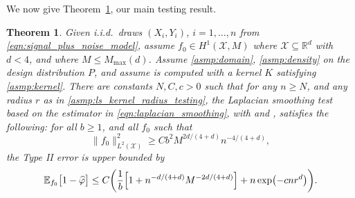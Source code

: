 \documentclass[twoside]{article}
\newcommand{\Reals}{\mathbb{R}}
\newcommand{\1}{\mathbf{1}}
\newcommand{\Rd}{\Reals^d}
\newcommand{\Xset}{\mathcal{X}}
\newcommand{\Leb}{L}
\newcommand{\Ebb}{\mathbb{E}}
\newcommand{\wh}[1]{\widehat{#1}}
\newtheorem{theorem}{Theorem}
\theoremstyle{definition}
\theoremstyle{remark}
\begin{document}
We now give Theorem~\ref{thm:laplacian_smoothing_testing}, our main testing result.
\begin{theorem}
	\label{thm:laplacian_smoothing_testing}
	Given i.i.d.\ draws $(X_i,Y_i)$, $i=1,\ldots,n$ from \eqref{eqn:signal_plus_noise_model}, assume $f_0 \in H^1(\Xset,M)$ where $\Xset \subseteq \Rd$ with $d < 4$, and where $M \leq M_{\max}(d)$. Assume \ref{asmp:domain}, \ref{asmp:density} on the design distribution $P$, and assume  is computed with a kernel $K$ satisfying \ref{asmp:kernel}. There are constants $N,C,c>0$ such that for any $n \geq N$, and any radius $r$ as in \ref{asmp:ls_kernel_radius_testing}, the Laplacian smoothing test \smash{$\wh{\varphi}$} based on the estimator \smash{$\wh{f}$} in \eqref{eqn:laplacian_smoothing}, with  and , satisfies the following: for all $b \geq 1$, and all $f_0$ such that
	\begin{equation}
	\label{eqn:laplacian_smoothing_testing}
	\bigl\|f_0\bigr\|_{\Leb^2(\Xset)}^2 \geq C b^2 M^{2d/(4 + d)} n^{-4/(4 + d)},
	\end{equation} 
	the Type II error is upper bounded by
	\begin{equation*}
	\Ebb_{f_0}\bigl[1 - \wh{\varphi} \bigr] \leq C\biggl(\frac{1}{b}\Bigl[1 + n^{-d/(4 + d)}M^{-2d/(4 + d)}\Bigr] + n\exp\bigl(-cnr^d\bigr)\biggr).
	\end{equation*}
\end{theorem}
\end{document}
